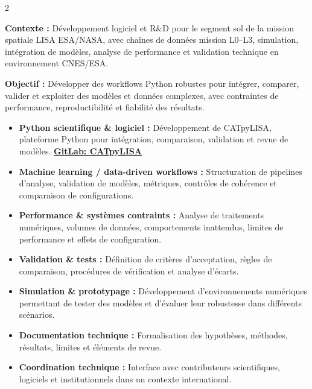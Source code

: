 \documentclass[8pt,a4paper,ragged2e,withhyper]{altacv}
\begin{document}
\begin{paracol}{2}
\divider


\textbf{Contexte :} Développement logiciel et R\&D pour le segment sol de la mission spatiale LISA ESA/NASA, avec chaînes de données mission L0--L3, simulation, intégration de modèles, analyse de performance et validation technique en environnement CNES/ESA.

\textbf{Objectif :} Développer des workflows Python robustes pour intégrer, comparer, valider et exploiter des modèles et données complexes, avec contraintes de performance, reproductibilité et fiabilité des résultats.

\begin{itemize}
  \item \textbf{Python scientifique \& logiciel :} Développement de CATpyLISA, plateforme Python pour intégration, comparaison, validation et revue de modèles.
  \textcolor{DarkPastelRed}{\href{https://gitlab.oca.eu/gboileau/lisa_l3_tools}{\bf GitLab: CATpyLISA}}
  \item \textbf{Machine learning / data-driven workflows :} Structuration de pipelines d’analyse, validation de modèles, métriques, contrôles de cohérence et comparaison de configurations.
  \item \textbf{Performance \& systèmes contraints :} Analyse de traitements numériques, volumes de données, comportements inattendus, limites de performance et effets de configuration.
  \item \textbf{Validation \& tests :} Définition de critères d’acceptation, règles de comparaison, procédures de vérification et analyse d’écarts.
  \item \textbf{Simulation \& prototypage :} Développement d’environnements numériques permettant de tester des modèles et d’évaluer leur robustesse dans différents scénarios.
  \item \textbf{Documentation technique :} Formalisation des hypothèses, méthodes, résultats, limites et éléments de revue.
  \item \textbf{Coordination technique :} Interface avec contributeurs scientifiques, logiciels et institutionnels dans un contexte international.
\end{itemize}

\divider



\end{paracol}
\end{document}
